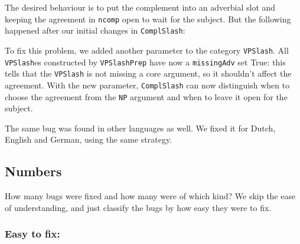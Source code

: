 \begin{itemize}
  The desired behaviour is to put the complement into an adverbial slot
  and keeping the agreement in \texttt{ncomp} open to wait for the
  subject. But the following happened after our initial changes in
  \texttt{ComplSlash}:

\begin{EmptyItem}
\begin{Highlighting}[]
    \FunctionTok{=}  \NormalTok{;}
\FunctionTok{=} \OtherTok{=>}  \NormalTok{\} ; }
\end{Highlighting}
\end{EmptyItem}
\end{itemize}

To fix this problem, we added another parameter to the category
\texttt{VPSlash}. All \texttt{VPSlash}es constructed by
\texttt{VPSlashPrep} have now a \texttt{missingAdv} set True: this tells
that the \texttt{VPSlash} is not missing a core argument, so it
shouldn't affect the agreement. With the new parameter,
\texttt{ComplSlash} can now distinguish when to choose the agreement
from the \texttt{NP} argument and when to leave it open for the subject.

The same bug was found in other languages as well. We fixed it for
Dutch, English and German, using the same strategy.

\subsection{Numbers}\label{numbers}

How many bugs were fixed and how many were of which kind? We skip the
ease of understanding, and just classify the bugs by how easy they were to fix.

\subsubsection{Easy to fix:}\label{easy-to-fix}


